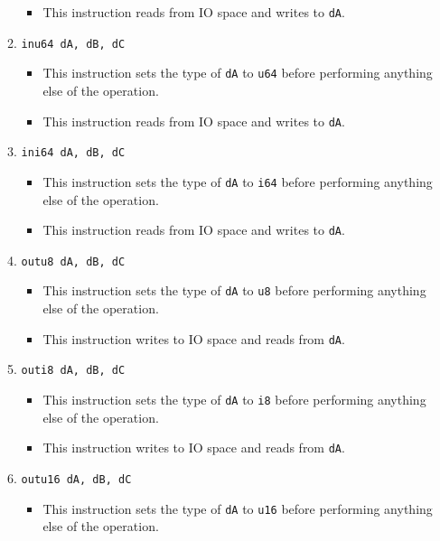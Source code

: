 \documentclass{article}
\begin{document}
\begin{itemize}
\begin{enumerate}
\begin{itemize}
				\item This instruction reads from IO space and writes to
				\texttt{dA}.
				\end{itemize}
			\item \texttt{inu64 dA, dB, dC}
				\begin{itemize}
				\item This instruction sets the type of \texttt{dA} to
				\texttt{u64} before performing anything else of the
				operation.

				\item This instruction reads from IO space and writes to
				\texttt{dA}.
				\end{itemize}
			\item \texttt{ini64 dA, dB, dC}
				\begin{itemize}
				\item This instruction sets the type of \texttt{dA} to
				\texttt{i64} before performing anything else of the
				operation.

				\item This instruction reads from IO space and writes to
				\texttt{dA}.
				\end{itemize}

			\item \texttt{outu8 dA, dB, dC}
				\begin{itemize}
				\item This instruction sets the type of \texttt{dA} to
				\texttt{u8} before performing anything else of the
				operation.

				\item This instruction writes to IO space and reads from
				\texttt{dA}.
				\end{itemize}
			\item \texttt{outi8 dA, dB, dC}
				\begin{itemize}
				\item This instruction sets the type of \texttt{dA} to
				\texttt{i8} before performing anything else of the
				operation.

				\item This instruction writes to IO space and reads from
				\texttt{dA}.
				\end{itemize}
			\item \texttt{outu16 dA, dB, dC}
				\begin{itemize}
				\item This instruction sets the type of \texttt{dA} to
				\texttt{u16} before performing anything else of the
				operation.


\end{itemize}
\end{enumerate}
\end{itemize}
\end{document}
